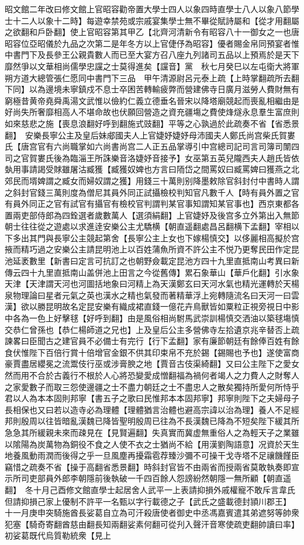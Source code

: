 昭文館二年改曰修文館上官昭容勸帝置大學士四人以象四時直學士八人以象八節學士十二人以象十二時】每遊幸禁苑或宗戚宴集學士無不畢從賦詩屬和【從才用翻屬之欲翻和戶卧翻】使上官昭容第其甲乙【北齊河清新令有昭容八十一御女之一也唐昭容位亞昭儀於九品之次第二是年冬方以上官倢伃為昭容】優者賜金帛同預宴者惟中書門下及長參王公親貴數人而已至大宴方召八座九列諸司五品以上預焉於是天下靡然爭以文華相尚儒學忠讜之士莫得進矣【讜音】黨　秋七月癸巳以左屯衛大將軍朔方道大總管張仁愿同中書門下三品　甲午清源尉呂元泰上疏【上時掌翻疏所去翻下同】以為邊境未寧鎮戍不息士卒困苦轉輸疲弊而營建佛寺日廣月滋勞人費財無有窮極昔黄帝堯舜禹湯文武惟以儉約仁義立德垂名晉宋以降塔廟競起而喪亂相繼由是好尚失所奢靡相高人不堪命故也伏願回營造之資充疆塲之費使烽燧永息羣生富庶則如來慈悲之施【喪息浪翻好呼到翻施式豉翻】平等之心孰過於此疏奏不省【省悉景翻】　安樂長寧公主及皇后妹郕國夫人上官婕妤婕妤母沛國夫人鄭氏尚宫柴氏賀婁氏【唐宫官有六尚職掌如六尚書尚宫二人正五品掌導引中宫總司記司言司簿司闈四司之官賀婁氏後為臨淄王所誅樂音洛婕妤音接予】女巫第五英兒隴西夫人趙氏皆依埶用事請謁受賕雖屠沽臧獲【臧獲奴婢也方言曰陑岱之間罵奴曰臧罵婢曰獲燕之北郊民而壻婢謂之臧女而婦奴謂之獲】用錢三十萬則别降墨敕除官斜封付中書時人謂之斜封官錢三萬則度為僧尼其員外同正試攝檢校判知官凡數千人【時有員外置之官有員外同正之官有試官有攝官有檢校官判謂判某官事知謂知某官事也】西京東都各置兩吏部侍郎為四銓選者歲數萬人【選須絹翻】上官婕妤及後宫多立外第出入無節朝士往往從之遊處以求進逹安樂公主尤驕横【朝直遥翻處昌呂翻横下孟翻】宰相以下多出其門與長寧公主競起第舍【長寧公主上女也下嫁楊慎交】以侈麗相高擬於宫掖而精巧過之安樂公主請昆明池上以百姓蒲魚所資不許公主不悦乃更奪民田作定昆池延袤數里【新書曰定言可抗訂之也朝野僉載定昆池方四十九里直抵南山考異曰新傳云四十九里直抵南山盖併池上田言之今從舊傳】累石象華山【華戶化翻】引水象天津【天津謂天河也河圖括地象曰河精上為天漢鄭玄曰天河水氣也精光運轉於天楊泉物理論曰星者元氣之英也漢水之精也氣發而著精華浮上宛轉隨流名曰天河一曰雲漢】欲以勝昆明故名定昆安樂有織成裙直錢一億花卉鳥獸皆如粟粒正視旁視日中影中各為一色上好擊毬【好呼到翻】由是風俗相尚駙馬武崇訓楊慎交洒油以築毬塲慎交恭仁曾孫也【恭仁楊師道之兄也】上及皇后公主多營佛寺左拾遺京兆辛替否上疏諫畧曰臣聞古之建官員不必備士有完行【行下孟翻】家有廉節朝廷有餘俸百姓有餘食伏惟陛下百倍行賞十倍增官金銀不供其印束帛不充於錫【錫賜也予也】遂使富商豪賈盡居纓冕之流鬻伎行巫或涉膏腴之地【賈音古伎渠綺翻】又曰公主陛下之愛女然而用不合於古義行不根於人心將恐變愛成憎翻福為禍何者竭人之力費人之財奪人之家愛數子而取三怨使邊疆之士不盡力朝廷之士不盡忠人之散矣獨持所愛何所恃乎君以人為本本固則邦寧【書五子之歌曰民惟邦本本固邦寧】邦寧則陛下之夫婦母子長相保也又曰若以造寺必為理體【理體猶言治體也避高宗諱以治為理】養人不足經邦則殷周以往皆暗亂漢魏已降皆聖明殷周已往為不長漢魏已降為不短矣陛下緩其所急急其所緩親未來而疎見在【見賢遍翻】失真實而冀虚無重俗人之為輕天子之業雖以隂陽為炭萬物為銅役不食之人使不衣之士猶尚不給【用漢劉陶語意】况資於天生地養風動雨潤而後得之乎一旦風塵再擾霜雹荐臻沙彌不可操干戈寺塔不足禳饑饉臣竊惜之疏奏不省【操于高翻省悉景翻】時斜封官皆不由兩省而授兩省莫敢執奏即宣示所司吏部員外郎李朝隱前後執破一千四百餘人怨謗紛然朝隱一無所顧【朝直遥翻】　冬十月己酉修文館直學士起居舍人武平一上表請抑損外戚權寵不敢斥言韋氏但請抑損己家上優制不許平一名甄以字行載德之子【武氏之盛載德封頴川郡王】　十一月庚申突騎施酋長娑葛自立為可汗殺唐使者御史中丞馮嘉賓遣其弟遮努等帥衆犯塞【騎奇寄翻酋慈由翻長知兩翻娑素何翻可從刋入聲汗音寒使疏吏翻帥讀曰率】初娑葛既代烏質勒統衆【見上